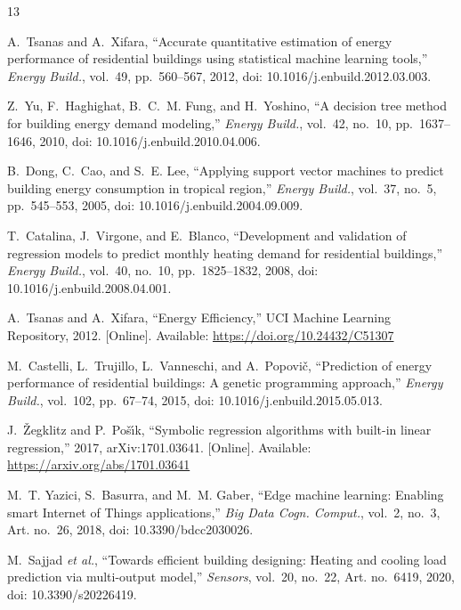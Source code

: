 \documentclass[journal]{IEEEtran}
\begin{document}
\begin{thebibliography}{13}

A.~Tsanas and A.~Xifara, ``Accurate quantitative estimation of energy performance of residential
buildings using statistical machine learning tools,'' \emph{Energy Build.}, vol.~49, pp.~560--567,
2012, doi: 10.1016/j.enbuild.2012.03.003.

Z.~Yu, F.~Haghighat, B.~C.~M. Fung, and H.~Yoshino, ``A decision tree method for building energy
demand modeling,'' \emph{Energy Build.}, vol.~42, no.~10, pp.~1637--1646, 2010,
doi: 10.1016/j.enbuild.2010.04.006.

B.~Dong, C.~Cao, and S.~E. Lee, ``Applying support vector machines to predict building energy
consumption in tropical region,'' \emph{Energy Build.}, vol.~37, no.~5, pp.~545--553, 2005,
doi: 10.1016/j.enbuild.2004.09.009.

T.~Catalina, J.~Virgone, and E.~Blanco, ``Development and validation of regression models to predict
monthly heating demand for residential buildings,'' \emph{Energy Build.}, vol.~40, no.~10,
pp.~1825--1832, 2008, doi: 10.1016/j.enbuild.2008.04.001.

A.~Tsanas and A.~Xifara, ``Energy Efficiency,'' UCI Machine Learning Repository, 2012.
[Online]. Available: \url{https://doi.org/10.24432/C51307}

M.~Castelli, L.~Trujillo, L.~Vanneschi, and A.~Popovi\v{c}, ``Prediction of energy performance of
residential buildings: A genetic programming approach,'' \emph{Energy Build.}, vol.~102, pp.~67--74,
2015, doi: 10.1016/j.enbuild.2015.05.013.

J.~\v{Z}egklitz and P.~Po\v{s}\'{\i}k, ``Symbolic regression algorithms with built-in linear
regression,'' 2017, arXiv:1701.03641. [Online]. Available: \url{https://arxiv.org/abs/1701.03641}

M.~T. Yazici, S.~Basurra, and M.~M. Gaber, ``Edge machine learning: Enabling smart Internet of Things
applications,'' \emph{Big Data Cogn. Comput.}, vol.~2, no.~3, Art. no.~26, 2018,
doi: 10.3390/bdcc2030026.

M.~Sajjad \emph{et al.}, ``Towards efficient building designing: Heating and cooling load prediction
via multi-output model,'' \emph{Sensors}, vol.~20, no.~22, Art. no.~6419, 2020,
doi: 10.3390/s20226419.


\end{thebibliography}
\end{document}
